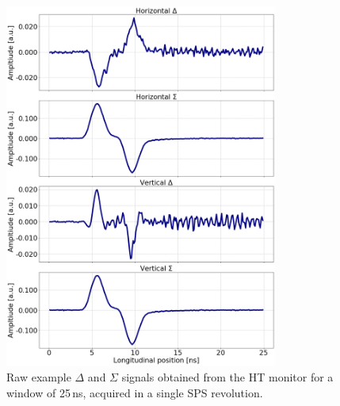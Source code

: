 \begin{figure}[!h]
   \centering         
   \includegraphics[width=0.8\textwidth]{images/Ch4/HT_1D__20180530_135105_exampleAcq_4thesis_turn3000.png}
       \caption{Raw example $\Delta$ and $\Sigma$ signals obtained from the HT monitor for a window of 25\,ns, acquired in a single SPS revolution.}
       \label{fig:HT_example_acq_singleTurn}
\end{figure}

